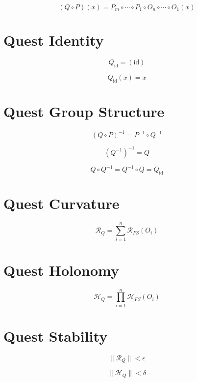 \[
(Q \circ P)(x)
= P_m \circ \cdots \circ P_1 \circ O_n \circ \cdots \circ O_1 (x)
\]


\section*{Quest Identity}

\[
Q_{\mathrm{id}} = (\mathrm{id})
\]

\[
Q_{\mathrm{id}}(x) = x
\]


\section*{Quest Group Structure}

\[
(Q \circ P)^{-1}
= P^{-1} \circ Q^{-1}
\]

\[
(Q^{-1})^{-1} = Q
\]

\[
Q \circ Q^{-1} = Q^{-1} \circ Q = Q_{\mathrm{id}}
\]


\section*{Quest Curvature}

\[
\mathcal{R}_Q
= \sum_{i=1}^{n}
\mathcal{R}_{FS}(O_i)
\]


\section*{Quest Holonomy}

\[
\mathcal{H}_Q
= \prod_{i=1}^{n}
\mathcal{H}_{FS}(O_i)
\]


\section*{Quest Stability}

\[
\|\mathcal{R}_Q\| < \epsilon
\]

\[
\|\mathcal{H}_Q\| < \delta
\]

